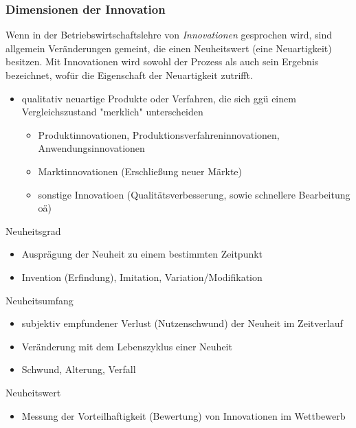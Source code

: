 \documentclass[11pt]{article}
\begin{document}
\subsubsection{Dimensionen der Innovation}
\label{sec:org0dd95b9}
Wenn in der Betriebswirtschaftslehre von \emph{Innovationen} gesprochen wird, sind allgemein Veränderungen gemeint, die einen Neuheitswert (eine Neuartigkeit) besitzen. Mit Innovationen wird sowohl der Prozess als auch sein Ergebnis bezeichnet, wofür die Eigenschaft der Neuartigkeit zutrifft.
\begin{itemize}
\item qualitativ neuartige Produkte oder Verfahren, die sich ggü einem Vergleichszustand "merklich" unterscheiden
\begin{itemize}
\item Produktinnovationen, Produktionsverfahreninnovationen, Anwendungsinnovationen
\item Marktinnovationen (Erschließung neuer Märkte)
\item sonstige Innovatioen (Qualitätsverbesserung, sowie schnellere Bearbeitung oä)
\end{itemize}
\end{itemize}

Neuheitsgrad
\begin{itemize}
\item Ausprägung der Neuheit zu einem bestimmten Zeitpunkt
\item Invention (Erfindung), Imitation, Variation/Modifikation
\end{itemize}

Neuheitsumfang
\begin{itemize}
\item subjektiv empfundener Verlust (Nutzenschwund) der Neuheit im Zeitverlauf
\item Veränderung mit dem Lebenszyklus einer Neuheit
\item Schwund, Alterung, Verfall
\end{itemize}

Neuheitswert
\begin{itemize}
\item Messung der Vorteilhaftigkeit (Bewertung) von Innovationen im Wettbewerb
\end{itemize}
\end{document}
